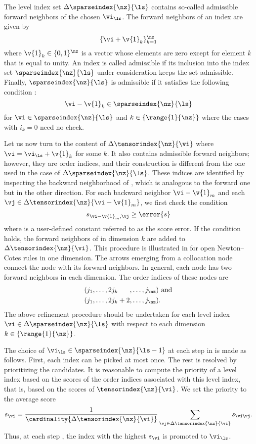 The level index set $\Delta\sparseindex{\nz}{\ls}$ contains so-called admissible
forward neighbors of the chosen $\vi_{\ls}$. The forward neighbors of an index
\vi are given by
\[
  \{ \vi + \v{1}_k \}_{k = 1}^\nz
\]
where $\v{1}_k \in \{ 0, 1 \}^\nz$ is a vector whose elements are zero except
for element $k$ that is equal to unity. An index \vi is called admissible if its
inclusion into the index set $\sparseindex{\nz}{\ls}$ under consideration keeps
the set admissible. Finally, $\sparseindex{\nz}{\ls}$ is admissible if it
satisfies the following condition \cite{klimke2006}:
\[
  \vi - \v{1}_k \in \sparseindex{\nz}{\ls}
\]
for $\vi \in \sparseindex{\nz}{\ls}$ and $k \in \{ \range{1}{\nz} \}$ where the
cases with $i_k = 0$ need no check.

Let us now turn to the content of $\Delta\tensorindex{\nz}{\vi}$ where $\vi =
\vi_{\ls} + \v{1}_k$ for some $k$. It also contains admissible forward
neighbors; however, they are order indices, and their construction is different
from the one used in the case of $\Delta\sparseindex{\nz}{\ls}$. These indices
are identified by inspecting the backward neighborhood of \vi, which is
analogous to the forward one but in the other direction. For each backward
neighbor $\vi - \v{1}_m$ and each $\vj \in \Delta\tensorindex{\nz}{\vi -
\v{1}_m}$, we first check the condition
\[
  s_{\vi - \v{1}_m, \vj} \geq \error{s}
\]
where  is a user-defined constant referred to as the score error. If
the condition holds, the forward neighbors of \vj in dimension $k$ are added to
$\Delta\tensorindex{\nz}{\vi}$. This procedure is illustrated in
 for open Newton--Cotes rules in one dimension. The arrows
emerging from a collocation node connect the node with its forward neighbors. In
general, each node has two forward neighbors in each dimension. The order
indices of these nodes are
\begin{align*}
  & (j_1, \dots, 2 j_k \phantom{{} + 2}, \dots, j_{\nz}) \text{ and} \\
  & (j_1, \dots, 2 j_k + 2,              \dots, j_{\nz}).
\end{align*}
The above refinement procedure should be undertaken for each level index $\vi
\in \Delta\sparseindex{\nz}{\ls}$ with respect to each dimension $k \in \{
\range{1}{\nz} \}$.

The choice of $\vi_{\ls} \in \sparseindex{\nz}{\ls - 1}$ at each step \ls in
 is made as follows. First, each index can be picked at
most once. The rest is resolved by prioritizing the candidates. It is reasonable
to compute the priority of a level index \vi based on the scores of the order
indices associated with this level index, that is, based on the scores of
$\tensorindex{\nz}{\vi}$. We set the priority to the average score
\[
  s_{\vi} = \frac{1}{\cardinality{\Delta\tensorindex{\nz}{\vi}}} \sum_{\vj \in \Delta\tensorindex{\nz}{\vi}} s_{\vi \vj}.
\]
Thus, at each step \ls, the index \vi with the highest $s_{\vi}$ is promoted to
$\vi_{\ls}$.

